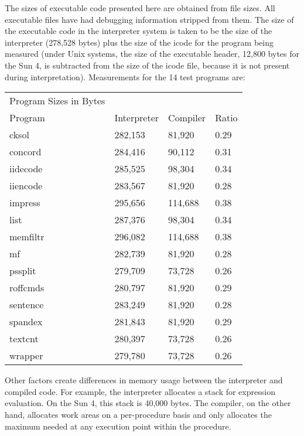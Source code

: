 The sizes of executable code presented here are obtained from file
sizes. All executable files have had debugging information stripped
from them. The size of the executable code in the interpreter system
is taken to be the size of the interpreter (278,528 bytes) plus the
size of the icode for the program being measured (under Unix systems,
the size of the executable header, 12,800 bytes for the Sun 4, is
subtracted from the size of the icode file, because it is not present
during interpretation). Measurements for the 14 test programs are:

\begin{center}
\tablefirsthead{}
\tablehead{}
\tabletail{}
\tablelasttail{}
\begin{supertabular}{m{1.5740598in}m{0.68795985in}m{0.60525984in}m{0.34695986in}}
 Program Sizes in Bytes &
~
 &
~
 &
~
\\
 Program &
 Interpreter &
 Compiler &
 Ratio\\
 cksol  &
 282,153  &
 81,920  &
 0.29 \\
 concord  &
 284,416  &
 90,112  &
 0.31 \\
 iidecode  &
 285,525  &
 98,304  &
 0.34 \\
 iiencode  &
 283,567  &
 81,920  &
 0.28 \\
 impress  &
 295,656  &
 114,688  &
 0.38 \\
 list  &
 287,376  &
 98,304  &
 0.34 \\
 memfiltr  &
 296,082  &
 114,688  &
 0.38 \\
 mf  &
 282,739  &
 81,920  &
 0.28 \\
 pssplit  &
 279,709  &
 73,728  &
 0.26 \\
 roffcmds  &
 280,797  &
 81,920  &
 0.29 \\
 sentence  &
 283,249  &
 81,920  &
 0.28 \\
 spandex  &
 281,843  &
 81,920  &
 0.29 \\
 textcnt  &
 280,397  &
 73,728  &
 0.26 \\
 wrapper  &
 279,780  &
 73,728  &
 0.26 \\
\end{supertabular}
\end{center}

Other factors create differences in memory usage between the
interpreter and compiled code. For example, the interpreter allocates
a stack for expression evaluation. On the Sun 4, this stack is 40,000
bytes. The compiler, on the other hand, allocates work areas on a
per-procedure basis and only allocates the maximum needed at any
execution point within the procedure.
